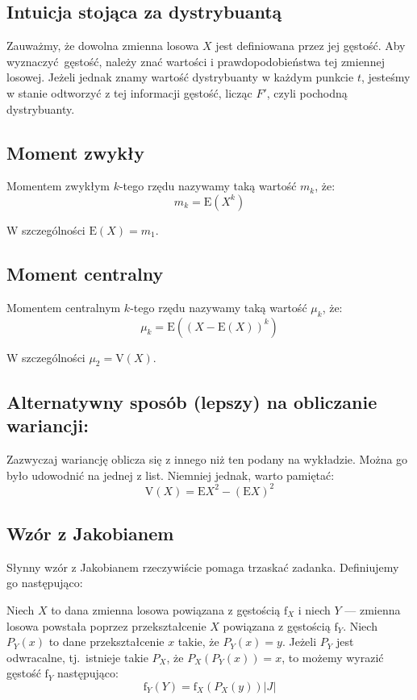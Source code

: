 \documentclass[a4paper,12pt]{article}
\begin{document}
\subsection{Intuicja stojąca za dystrybuantą}
Zauważmy, że dowolna zmienna losowa $X$ jest definiowana przez jej gęstość. Aby wyznaczyć gęstość, należy znać wartości i prawdopodobieństwa tej zmiennej losowej. Jeżeli jednak znamy wartość dystrybuanty w każdym punkcie $t$, jesteśmy w stanie odtworzyć z tej informacji gęstość, licząc $F'$, czyli pochodną dystrybuanty.

\subsection{Moment zwykły} 
Momentem zwykłym $k$-tego rzędu nazywamy taką wartość $m_k$, że:
\begin{equation}
m_k = \textrm{E}\left(X^k\right)
\end{equation}

W szczególności $\textrm{E}\left(X\right) = m_1$.

\subsection{Moment centralny}
Momentem centralnym $k$-tego rzędu nazywamy taką wartość $\mu_k$, że:
\begin{equation}
\mu_k = \textrm{E}\left(\left(X - \textrm{E}\left(X\right)\right)^k\right)
\end{equation}

W szczególności $\mu_2 = \textrm{V}\left(X\right)$.

\subsection{Alternatywny sposób (lepszy) na obliczanie wariancji:}
Zazwyczaj wariancję oblicza się z innego niż ten podany na wykładzie. Można go było udowodnić na jednej z list. Niemniej jednak, warto pamiętać:
\begin{equation}
\textrm{V}\left(X\right) = \textrm{E}X^2 - \left(\textrm{E}X\right)^2
\end{equation}

\subsection{Wzór z Jakobianem}
Słynny wzór z Jakobianem rzeczywiście pomaga trzaskać zadanka. Definiujemy go następująco:

Niech $X$ to dana zmienna losowa powiązana z gęstością $\textrm{f}_X$ i niech $Y$ --- zmienna losowa powstała poprzez przekształcenie $X$ powiązana z gęstością $\textrm{f}_Y$. Niech $P_Y\left(x\right)$ to dane przekształcenie $x$ takie, że $P_Y\left(x\right) = y$. Jeżeli $P_Y$ jest odwracalne, tj.\ istnieje takie $P_X$, że $P_X\left(P_Y\left(x\right)\right) = x$, to możemy wyrazić gęstość $\textrm{f}_Y$ następująco:
\begin{equation}
\textrm{f}_Y\left(Y\right) = \textrm{f}_X\left(P_X\left(y\right)\right)|J|
\end{equation}
\end{document}

